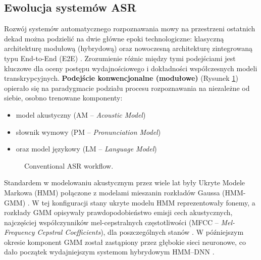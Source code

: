 \subsection{Ewolucja systemów ASR}

Rozwój systemów automatycznego rozpoznawania mowy na przestrzeni ostatnich dekad można podzielić na dwie główne epoki technologiczne: klasyczną architekturę modułową (hybrydową) oraz nowoczesną architekturę zintegrowaną typu End-to-End (E2E) \cite[s.~315--316]{pondel2024e2e}. Zrozumienie różnic między tymi podejściami jest kluczowe dla oceny postępu wydajnościowego i dokładności współczesnych modeli transkrypcyjnych.
\textbf{Podejście konwencjonalne (modułowe)} (Rysunek \ref{fig:conventional_asr}) opierało się na paradygmacie podziału procesu rozpoznawania na niezależne od siebie, osobno trenowane komponenty:
\begin{itemize}
\item model akustyczny (AM – \textit{Acoustic Model})

\item słownik wymowy (PM – \textit{Pronunciation Model})

\item oraz model językowy (LM – \textit{Language Model})
\end{itemize}
\begin{figure}[htbp]
    \caption{Conventional ASR workflow.}
    \label{fig:conventional_asr}
\end{figure}
Standardem w modelowaniu akustycznym przez wiele lat były Ukryte Modele Markowa (HMM) połączone z modelami mieszanin rozkładów Gaussa (HMM-GMM) \cite[s.~20]{pudo2024optimizing}. W tej konfiguracji stany ukryte modelu HMM reprezentowały fonemy, a rozkłady GMM opisywały prawdopodobieństwo emisji cech akustycznych, najczęściej współczynników mel-cepstralnych częstotliwości (MFCC -- \textit{Mel-Frequency Cepstral Coefficients}), dla poszczególnych stanów \cite[s.~315]{pondel2024e2e}. W późniejszym okresie komponent GMM został zastąpiony przez głębokie sieci neuronowe, co dało początek wydajniejszym systemom hybrydowym HMM--DNN \cite[s.~20]{pudo2024optimizing}.

